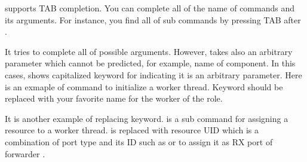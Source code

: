 \documentclass[a4paper,11pt,openany,oneside,english]{sphinxmanual}
\begin{document}
 supports TAB completion. You can complete all of the name
of commands and its arguments. For instance, you find all of sub commands
by pressing TAB after .

\begin{sphinxVerbatim}[commandchars=\\\{\},formatcom=\footnotesize]
\end{sphinxVerbatim}

It tries to complete all of possible arguments. However,  takes
also an arbitrary parameter which cannot be predicted, for example, name of
component. In this cases,  shows capitalized keyword for
indicating it is an arbitrary parameter. Here is an exmaple of 
command to initialize a worker thread. Keyword  should be replaced with
your favorite name for the worker of the role.

\begin{sphinxVerbatim}[commandchars=\\\{\},formatcom=\footnotesize]
\end{sphinxVerbatim}

It is another example of replacing keyword.  is a sub command for
assigning a resource to a worker thread.  is replaced with
resource UID which is a combination of port type and its ID such as
 or  to assign it as RX port of forwarder .

\begin{sphinxVerbatim}[commandchars=\\\{\},formatcom=\footnotesize]
\end{sphinxVerbatim}
\end{document}
